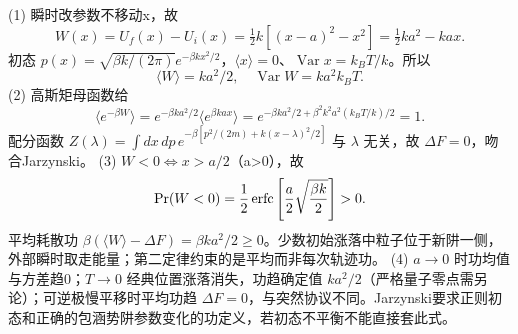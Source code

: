 (1) 瞬时改参数不移动x，故
\[
W(x)=U_f(x)-U_i(x)=\tfrac12k[(x-a)^2-x^2]=\tfrac12ka^2-kax.
\]
初态 \(p(x)=\sqrt{\beta k/(2\pi)}e^{-\beta kx^2/2}\)，\(\langle x\rangle=0\)、\(\operatorname{Var}x=k_BT/k\)。所以
\[
\langle W\rangle=ka^2/2,\quad \operatorname{Var}W=k a^2k_BT.
\]
(2) 高斯矩母函数给
\[
\langle e^{-\beta W}\rangle
=e^{-\beta ka^2/2}\langle e^{\beta k a x}\rangle
=e^{-\beta ka^2/2+\beta^2 k^2a^2(k_BT/k)/2}=1.
\]
配分函数 \(Z(\lambda)=\int dx\,dp\,e^{-\beta[p^2/(2m)+k(x-\lambda)^2/2]}\) 与 \(\lambda\) 无关，故 \(\Delta F=0\)，吻合Jarzynski。
(3) \(W<0\iff x>a/2\)（a>0），故
\[
\Pr(W<0)={1\over2}\operatorname{erfc}\left[{a\over2}\sqrt{\beta k\over2}\right]>0.
\]
平均耗散功 \(\beta(\langle W\rangle-\Delta F)=\beta ka^2/2\ge0\)。少数初始涨落中粒子位于新阱一侧，外部瞬时取走能量；第二定律约束的是平均而非每次轨迹功。
(4) \(a\to0\) 时功均值与方差趋0；\(T\to0\) 经典位置涨落消失，功趋确定值 \(ka^2/2\)（严格量子零点需另论）；可逆极慢平移时平均功趋 \(\Delta F=0\)，与突然协议不同。Jarzynski要求正则初态和正确的包涵势阱参数变化的功定义，若初态不平衡不能直接套此式。
